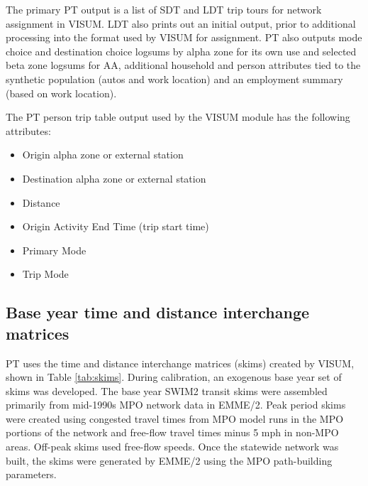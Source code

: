 The primary PT output is a list of SDT and LDT trip tours for network assignment in VISUM. LDT also prints out an initial output, prior to additional processing into the format used by VISUM for assignment. PT also outputs mode choice and destination choice logsums by alpha zone for its own use and selected beta zone logsums for AA, additional household and person attributes tied to the synthetic population (autos and work location) and an employment summary (based on work location).


The PT person trip table output used by the VISUM module has the following attributes:
\begin{itemize}
\item Origin alpha zone or external station
\item Destination alpha zone or external station
\item Distance
\item Origin Activity End Time (trip start time)
\item Primary Mode
\item Trip Mode
\end{itemize}

\subsection{Base year time and distance interchange matrices}
PT uses the time and distance interchange matrices (skims) created by VISUM, shown in Table \ref{tab:skims}. During calibration, an exogenous base year set of skims was developed. The base year SWIM2 transit skims were assembled primarily from mid-1990s MPO network data in EMME/2. Peak period skims were created using congested travel times from MPO model runs in the MPO portions of the network and free-flow travel times minus 5 mph in non-MPO areas. Off-peak skims used free-flow speeds. Once the statewide network was built, the skims were generated by EMME/2 using the MPO path-building parameters.

